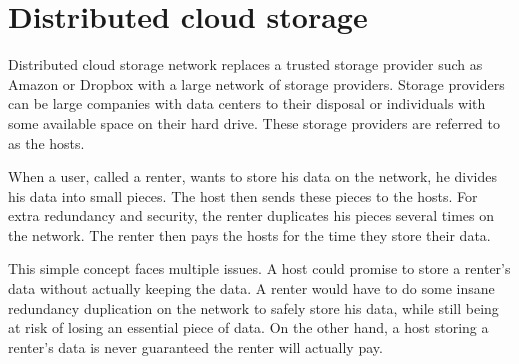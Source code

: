 \section{Distributed cloud storage}
\label{blockchain-distributed-storage}

\iffalse

- idea: instead of trusting a central party: 
  - divide your storage data into little pieces and send the pieces to different storage providers => process of dividing is referred to as sharding. storage providers can be anyone: large companies with data centers or individuals with available space on their hard drive. 
  - you send your shards of data to a storage provider. you can send every shard just once, or you could store it multiple times to be sure your data never disappears. the renter pays the hosts for the time they store their data.

- however: multiple issues arise in this system: what if a host promises to store your data, but actually does not, what if a renter doesn't pay for the used storage space?

- there are currently several solutions out there that try implement this concept, such as siacoin, storj and swarm. Others, such as ipfs and maidsafe, want to go even further trying to replace the internet as we know it.

\fi

Distributed cloud storage network replaces a trusted storage provider such as Amazon or Dropbox with a large network of storage providers. Storage providers can be large companies with data centers to their disposal or individuals with some available space on their hard drive. These storage providers are referred to as the hosts. 

When a user, called a renter, wants to store his data on the network, he divides his data into small pieces. The host then sends these pieces to the hosts. For extra redundancy and security, the renter duplicates his pieces several times on the network. The renter then pays the hosts for the time they store their data.

This simple concept faces multiple issues. A host could promise to store a renter's data without actually keeping the data. A renter would have to do some insane redundancy duplication on the network to safely store his data, while still being at risk of losing an essential piece of data. On the other hand, a host storing a renter's data is never guaranteed the renter will actually pay.

